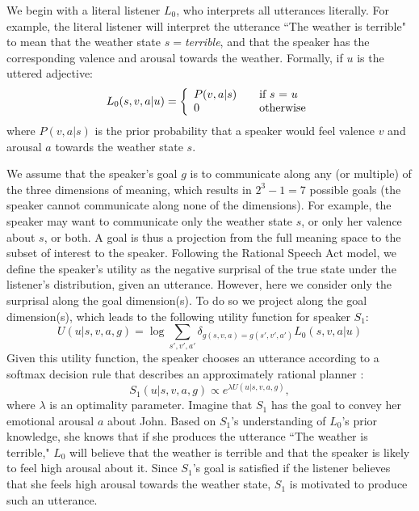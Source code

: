 \documentclass[10pt,letterpaper]{article}
\begin{document}
We begin with a literal listener $L_0$, who interprets all utterances literally. For example, the literal listener will interpret the utterance ``The weather is terrible" to mean that the weather state $s=$\emph{terrible}, and that the speaker has the corresponding valence and arousal towards the weather. Formally, if $u$ is the uttered adjective:
\[ L_0(s, v, a|u) = \left\{ 
  \begin{array}{l l}
    P(v, a | s) & \quad \text{if $s$ = $u$}\\
    0 & \quad \text{otherwise}
  \end{array} \right.\]
where $P(v, a | s)$ is the prior probability that a speaker would feel valence $v$ and arousal $a$ towards the weather state $s$.

We assume that the speaker's goal $g$ is to communicate  along any (or multiple) of the three dimensions of meaning, which results in $2^3 - 1 = 7$ possible goals (the speaker cannot communicate along none of the dimensions). For example, the speaker may want to communicate only the weather state $s$, or only her valence about $s$, or both.
A goal is thus a projection from the full meaning space to the subset of interest to the speaker. Following the Rational Speech Act model, we define the speaker's utility as the negative surprisal of the true state under the listener's distribution, given an utterance. However, here we consider only the surprisal along the goal dimension(s). 
To do so we project along the goal dimension(s), which leads to the following utility function for speaker $S_1$:
\begin{equation}
U(u | s, v, a, g) = \log \sum_{s', v', a'} \delta_{g(s, v, a)=g(s', v', a')} L_0(s, v, a |u)
\end{equation}
Given this utility function, the speaker chooses an utterance according to a softmax decision rule that describes an approximately rational planner \cite{sutton1998reinforcement}:
\begin{equation}
S_1(u | s, v, a, g) \propto e^{\lambda U(u | s, v, a, g)},
\end{equation}
where $\lambda$ is an optimality parameter. 
%
Imagine that $S_1$ has the goal to convey her emotional arousal $a$ about John. Based on $S_1$'s understanding of $L_0$'s prior knowledge, she knows that if she produces the utterance ``The weather is terrible," $L_0$ will believe that the weather is terrible and that the speaker is likely to feel high arousal about it. Since $S_1$'s goal is satisfied if the listener believes that she feels high arousal towards the weather state, $S_1$ is motivated to produce such an utterance. 
\end{document}
